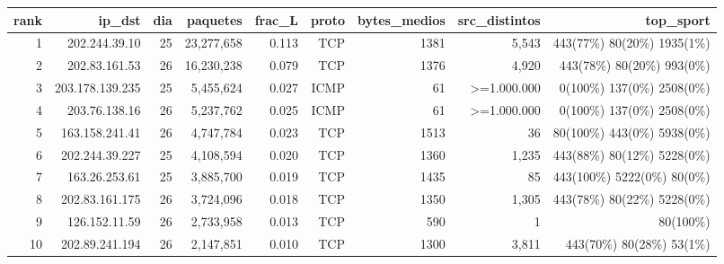 \begin{tabular}{rrrrrrrrr}
\toprule
rank & ip\_dst & dia & paquetes & frac\_L & proto & bytes\_medios & src\_distintos & top\_sport \\
\midrule
1 & 202.244.39.10 & 25 & 23,277,658 & 0.113 & TCP & 1381 & 5,543 & 443(77\%) 80(20\%) 1935(1\%) \\
2 & 202.83.161.53 & 26 & 16,230,238 & 0.079 & TCP & 1376 & 4,920 & 443(78\%) 80(20\%) 993(0\%) \\
3 & 203.178.139.235 & 25 & 5,455,624 & 0.027 & ICMP & 61 & >=1.000.000 & 0(100\%) 137(0\%) 2508(0\%) \\
4 & 203.76.138.16 & 26 & 5,237,762 & 0.025 & ICMP & 61 & >=1.000.000 & 0(100\%) 137(0\%) 2508(0\%) \\
5 & 163.158.241.41 & 26 & 4,747,784 & 0.023 & TCP & 1513 & 36 & 80(100\%) 443(0\%) 5938(0\%) \\
6 & 202.244.39.227 & 25 & 4,108,594 & 0.020 & TCP & 1360 & 1,235 & 443(88\%) 80(12\%) 5228(0\%) \\
7 & 163.26.253.61 & 25 & 3,885,700 & 0.019 & TCP & 1435 & 85 & 443(100\%) 5222(0\%) 80(0\%) \\
8 & 202.83.161.175 & 26 & 3,724,096 & 0.018 & TCP & 1350 & 1,305 & 443(78\%) 80(22\%) 5228(0\%) \\
9 & 126.152.11.59 & 26 & 2,733,958 & 0.013 & TCP & 590 & 1 & 80(100\%) \\
10 & 202.89.241.194 & 26 & 2,147,851 & 0.010 & TCP & 1300 & 3,811 & 443(70\%) 80(28\%) 53(1\%) \\
\bottomrule
\end{tabular}
